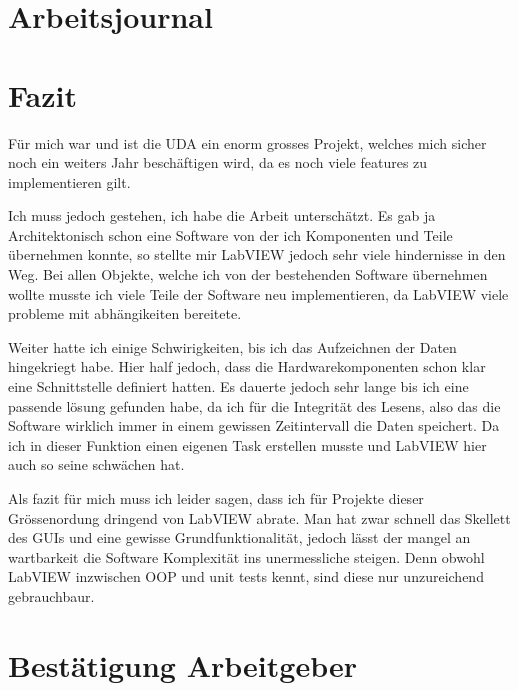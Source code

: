 \documentclass[10pt]{scrartcl}
\begin{document}
\section{Arbeitsjournal}
\section{Fazit}
Für mich war und ist die UDA ein enorm grosses Projekt, welches mich sicher noch ein weiters Jahr beschäftigen wird, da es noch viele features zu implementieren gilt.

Ich muss jedoch gestehen, ich habe die Arbeit unterschätzt. Es gab ja Architektonisch schon eine Software von der ich Komponenten und Teile übernehmen konnte, so stellte mir LabVIEW jedoch sehr viele hindernisse in den Weg. Bei allen Objekte, welche ich von der bestehenden Software übernehmen wollte musste ich viele Teile der Software neu implementieren, da LabVIEW viele probleme mit abhängikeiten bereitete.

Weiter hatte ich einige Schwirigkeiten, bis ich das Aufzeichnen der Daten hingekriegt habe. Hier half jedoch, dass die Hardwarekomponenten schon klar eine Schnittstelle definiert hatten. Es dauerte jedoch sehr lange bis ich eine passende lösung gefunden habe, da ich für die Integrität des Lesens, also das die Software wirklich immer in einem gewissen Zeitintervall die Daten speichert. Da ich in dieser Funktion einen eigenen Task erstellen musste und LabVIEW hier auch so seine schwächen hat.

Als fazit für mich muss ich leider sagen, dass ich für Projekte dieser Grössenordung dringend von LabVIEW abrate. Man hat zwar schnell das Skellett des GUIs und eine gewisse Grundfunktionalität, jedoch lässt der mangel an wartbarkeit die Software Komplexität ins unermessliche steigen. Denn obwohl LabVIEW inzwischen OOP und unit tests kennt, sind diese nur unzureichend gebrauchbaur.
\section{Bestätigung Arbeitgeber}


\end{document}

